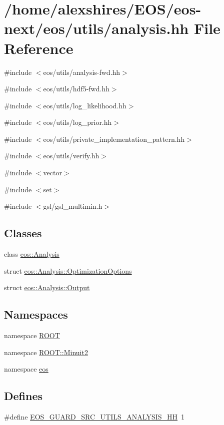 \hypertarget{analysis_8hh}{
\section{/home/alexshires/EOS/eos-\/next/eos/utils/analysis.hh File Reference}
\label{analysis_8hh}
}
{\ttfamily \#include $<$eos/utils/analysis-\/fwd.hh$>$}\par
{\ttfamily \#include $<$eos/utils/hdf5-\/fwd.hh$>$}\par
{\ttfamily \#include $<$eos/utils/log\_\-likelihood.hh$>$}\par
{\ttfamily \#include $<$eos/utils/log\_\-prior.hh$>$}\par
{\ttfamily \#include $<$eos/utils/private\_\-implementation\_\-pattern.hh$>$}\par
{\ttfamily \#include $<$eos/utils/verify.hh$>$}\par
{\ttfamily \#include $<$vector$>$}\par
{\ttfamily \#include $<$set$>$}\par
{\ttfamily \#include $<$gsl/gsl\_\-multimin.h$>$}\par
\subsection*{Classes}
\begin{DoxyCompactItemize}
\item 
class \hyperlink{classeos_1_1Analysis}{eos::Analysis}
\item 
struct \hyperlink{structeos_1_1Analysis_1_1OptimizationOptions}{eos::Analysis::OptimizationOptions}
\item 
struct \hyperlink{structeos_1_1Analysis_1_1Output}{eos::Analysis::Output}
\end{DoxyCompactItemize}
\subsection*{Namespaces}
\begin{DoxyCompactItemize}
\item 
namespace \hyperlink{namespaceROOT}{ROOT}
\item 
namespace \hyperlink{namespaceROOT_1_1Minuit2}{ROOT::Minuit2}
\item 
namespace \hyperlink{namespaceeos}{eos}
\end{DoxyCompactItemize}
\subsection*{Defines}
\begin{DoxyCompactItemize}
\item 
\#define \hyperlink{analysis_8hh_afbc3a34a049a4477d7a33b9e9e491f19}{EOS\_\-GUARD\_\-SRC\_\-UTILS\_\-ANALYSIS\_\-HH}~1
\end{DoxyCompactItemize}


